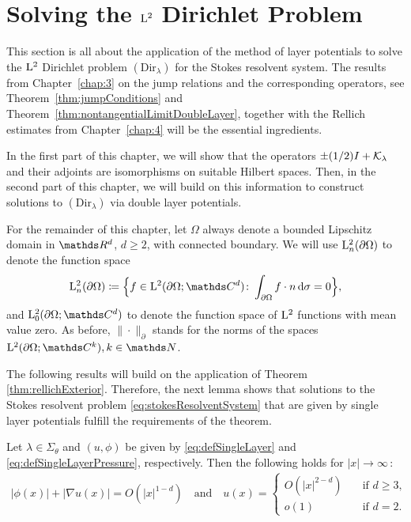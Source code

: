 \chapter{Solving the $\mathrm{L}^2$ Dirichlet Problem}
\label{chap:5}

This section is all about the application of the method of layer potentials to solve the $\mathrm{L}^2$ Dirichlet problem \hyperref[eq:dirProblem]{$(\mathrm{Dir}_\lambda)$} for the Stokes resolvent system.
The results from Chapter~\ref{chap:3} on the jump relations and the corresponding operators, see Theorem~\ref{thm:jumpConditions} and Theorem~\ref{thm:nontangentialLimitDoubleLayer}, together with the Rellich estimates from Chapter~\ref{chap:4} will be the essential ingredients.

In the first part of this chapter, we will show that the operators $\pm (1/2)I + \mathcal{K}_\lambda$ and their adjoints are isomorphisms on suitable Hilbert spaces.
Then, in the second part of this chapter, we will build on this information to construct solutions to $(\mathrm{Dir}_\lambda)$ via double layer potentials.

For the remainder of this chapter, let $\Omega$ always denote a bounded Lipschitz domain in $\R^d$, $d \geq 2$, with connected boundary.
We will use $\mathrm{L}^2_n(\partial\Omega)$ to denote the function space
\begin{align*}
  \Ell^2_n(\partial\Omega) \coloneqq \Big\{ f \in \Ell^2(\partial\Omega; \C^d) \colon \int_{\partial\Omega} f \cdot n \d \sigma = 0 \Big\},
\end{align*}
and $\Ell_0^2(\partial\Omega; \C^d)$  to denote the function space of $\mathrm{L}^2$ functions with mean value zero.
As before, $\| \cdot \|^{}_\partial$ stands for the norms of the spaces $\Ell^2(\partial\Omega; \C^k), k \in \N$.

The following results will build on the application of Theorem \ref{thm:rellichExterior}.
Therefore, the next lemma shows that solutions to the Stokes resolvent problem \eqref{eq:stokesResolventSystem} that are given by single layer potentials fulfill the requirements of the theorem.

\begin{lem}
  \label{lem:requirements}
  Let $\lambda \in \Sigma_\theta$ and $(u,\phi)$ be given by \eqref{eq:defSingleLayer} and \eqref{eq:defSingleLayerPressure}, respectively.
  Then the following holds for $|x| \to \infty\,$:
  \begin{align*}
    |\phi(x)| + |\nabla u(x)| = O(|x|^{1 - d}) \quad\text{and}\quad 
    u(x) = \begin{cases} O(|x|^{2 - d}) &\quad\text{if } d \geq 3, \\ o(1) &\quad\text{if } d = 2. \end{cases}
  \end{align*}
\end{lem}

